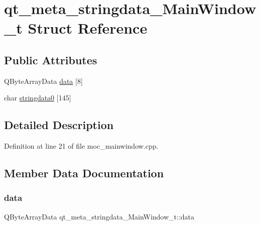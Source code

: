 \hypertarget{structqt__meta__stringdata___main_window__t}{}\section{qt\+\_\+meta\+\_\+stringdata\+\_\+\+Main\+Window\+\_\+t Struct Reference}
\label{structqt__meta__stringdata___main_window__t}
\subsection*{Public Attributes}
\begin{DoxyCompactItemize}
\item 
Q\+Byte\+Array\+Data \mbox{\hyperlink{structqt__meta__stringdata___main_window__t_a092956d0ba2e51cd73092e8a5ebb6ce6}{data}} \mbox{[}8\mbox{]}
\item 
char \mbox{\hyperlink{structqt__meta__stringdata___main_window__t_a17b51b6af12b7f5ebb4f7b55545039db}{stringdata0}} \mbox{[}145\mbox{]}
\end{DoxyCompactItemize}


\subsection{Detailed Description}


Definition at line 21 of file moc\+\_\+mainwindow.\+cpp.



\subsection{Member Data Documentation}
\mbox{\label{structqt__meta__stringdata___main_window__t_a092956d0ba2e51cd73092e8a5ebb6ce6}} 
\subsubsection{\texorpdfstring{data}{data}}
{\footnotesize\ttfamily Q\+Byte\+Array\+Data qt\+\_\+meta\+\_\+stringdata\+\_\+\+Main\+Window\+\_\+t\+::data}



